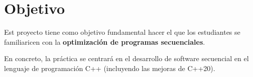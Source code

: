 \section{Objetivo}

Est proyecto tiene como objetivo fundamental hacer el que los
estudiantes se familiaricen con la \textbf{optimización de programas
secuenciales}.

En concreto, la práctica se centrará en el desarrollo de software
secuencial en el lenguaje de programación C++ (incluyendo las mejoras de
C++20).
